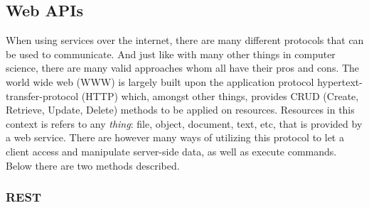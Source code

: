 \documentclass{cslthse-msc}
\begin{document}
    \subsection{Web APIs}

    When using services over the internet, there are many different protocols that can be used to communicate.
    And just like with many other things in computer science, there are many valid approaches whom all have their
    pros and cons. The world wide web (WWW) is largely built upon the application protocol
    hypertext-transfer-protocol (HTTP) which, amongst other things, provides CRUD (Create, Retrieve, Update, Delete)
    methods to be applied on resources. Resources in this context is refers to any \textit{thing}: file, object, document,
    text, etc, that is provided by a web service. There are however many ways of utilizing this protocol to let a
    client access and manipulate server-side data, as well as execute commands. Below there are two methods described.

    \subsubsection{REST}
\end{document}
